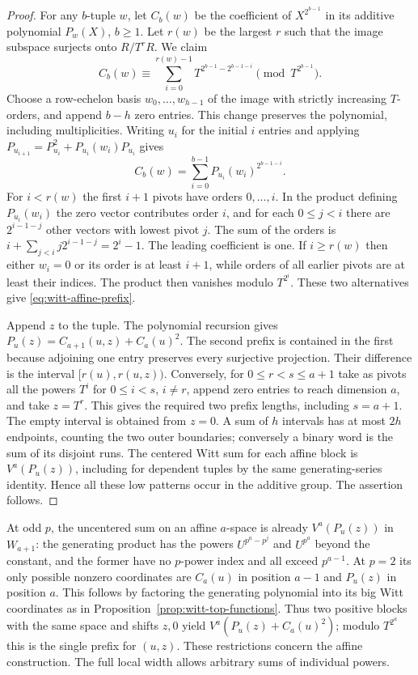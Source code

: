 \documentclass[11pt,letterpaper]{article}
\theoremstyle{definition}
\numberwithin{equation}{section}
\begin{document}
\begin{proof}
For any $b$-tuple $w$, let $C_b(w)$ be the coefficient of
$X^{2^{b-1}}$ in its additive polynomial $P_w(X)$, $b\ge1$.
Let $r(w)$ be the largest $r$ such that the image subspace
surjects onto $R/T^rR$. We claim
\begin{equation}\label{eq:witt-affine-prefix}
 C_b(w)\equiv
 \sum_{i=0}^{r(w)-1} T^{2^{b-1}-2^{b-1-i}}
                 \pmod{T^{2^{b-1}}}.
\end{equation}
Choose a row-echelon basis $w_0,\ldots,w_{h-1}$ of the image with
strictly increasing $T$-orders, and append $b-h$ zero entries.
This change preserves the polynomial, including multiplicities.
Writing $u_i$ for the initial $i$ entries and applying
$P_{u_{i+1}}=P_{u_i}^2+P_{u_i}(w_i)P_{u_i}$ gives
\[
                 C_b(w)=\sum_{i=0}^{b-1}
                          P_{u_i}(w_i)^{2^{b-1-i}}.
\]
For $i<r(w)$ the first $i+1$ pivots have orders $0,\ldots,i$.
In the product defining $P_{u_i}(w_i)$
the zero vector contributes order $i$, and for each $0\le j<i$
there are $2^{i-1-j}$ other vectors with lowest pivot $j$.
The sum of the orders is $i+\sum_{j<i}j2^{i-1-j}=2^i-1$.
The leading coefficient is one. If $i\ge r(w)$ then either
$w_i=0$ or its order is at least $i+1$, while orders of all
earlier pivots are at least their indices. The product then vanishes
modulo $T^{2^i}$. These two alternatives give
\eqref{eq:witt-affine-prefix}.

Append $z$ to the tuple. The polynomial recursion gives
$P_u(z)=C_{a+1}(u,z)+C_a(u)^2$. The second prefix is contained
in the first because adjoining one entry preserves every surjective
projection. Their difference is the interval
$[r(u),r(u,z))$. Conversely, for $0\le r<s\le a+1$ take as
pivots all the powers $T^i$ for $0\le i<s$, $i\ne r$, append
zero entries to reach dimension $a$, and take $z=T^r$.
This gives the required two prefix lengths, including $s=a+1$.
The empty interval is obtained from $z=0$.
A sum of $h$ intervals has at most $2h$ endpoints, counting the
two outer boundaries; conversely a binary word is the sum of its
disjoint runs. The centered Witt sum for each affine block is
$V^a(P_u(z))$, including for dependent tuples by the same
generating-series identity. Hence all these low patterns occur in
the additive group. The assertion follows.
\end{proof}

At odd $p$, the uncentered sum on an affine $a$-space is already
$V^a(P_u(z))$ in $W_{a+1}$: the generating product has the powers
$U^{p^a-p^j}$ and $U^{p^a}$ beyond the constant, and the former
have no $p$-power index and all exceed $p^{a-1}$. At $p=2$ its
only possible nonzero coordinates are $C_a(u)$ in position $a-1$
and $P_u(z)$ in position $a$. This follows by factoring the
generating polynomial into its big Witt coordinates as in
Proposition~\ref{prop:witt-top-functions}. Thus two positive blocks
with the same space and shifts $z,0$ yield
$V^a(P_u(z)+C_a(u)^2)$; modulo $T^{2^a}$ this is the single
prefix for $(u,z)$. These restrictions concern the affine construction.
The full local width allows arbitrary sums of individual powers.
\end{document}
